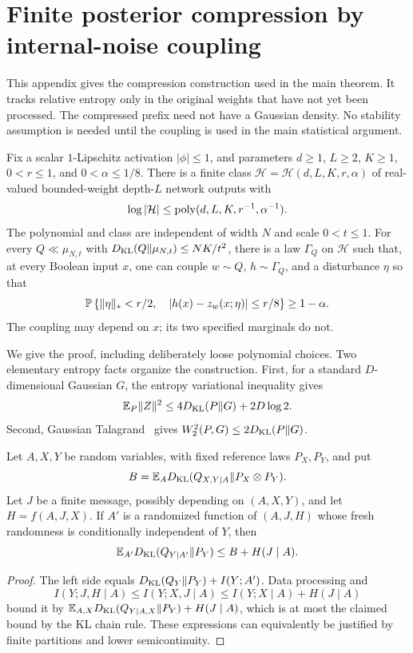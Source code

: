 \section{Finite posterior compression by internal-noise coupling}
\label{sec:robust-entropy}

This appendix gives the compression construction used in the main theorem.
It tracks relative entropy only in the original weights that have not yet
been processed. The compressed prefix need not have a Gaussian density.
No stability assumption is needed until the coupling is used in the main
statistical argument.

\begin{theorem}
\label{thm:robust-entropy}
Fix a scalar $1$-Lipschitz activation $|\phi|\le1$, and parameters
$d\ge1$, $L\ge2$, $K\ge1$, $0<r\le1$, and $0<\alpha\le1/8$.
There is a finite class $\mathcal H=\mathcal H(d,L,K,r,\alpha)$ of
real-valued bounded-weight depth-$L$ network outputs with
\[
 \log|\mathcal H|\le\operatorname{poly}(d,L,K,r^{-1},\alpha^{-1}).
\]
The polynomial and class are independent of width $N$ and scale $0<t\le1$.
For every $Q\ll\mu_{N,t}$ with
$D_{\rm KL}(Q\Vert\mu_{N,t})\le NK/t^2$, there is a law $\Gamma_Q$ on
$\mathcal H$ such that, at every Boolean input $x$, one can couple
$w\sim Q$, $h\sim\Gamma_Q$, and a disturbance $\eta$ so that
\[
 \mathbb P\left\{\|\eta\|_*<r/2,\quad
       |h(x)-z_w(x;\eta)|\le r/8\right\}\ge1-\alpha.
\]
The coupling may depend on $x$; its two specified marginals do not.
\end{theorem}

We give the proof, including deliberately loose polynomial choices.
Two elementary entropy facts organize the construction. First, for a standard
$D$-dimensional Gaussian $G$, the entropy variational inequality gives
\begin{equation}\label{eq:entropy-moment}
 \mathbb E_P\|Z\|^2\le4D_{\rm KL}(P\Vert G)+2D\log2.
\end{equation}
Second, Gaussian Talagrand~\cite{talagrand} gives
$W_2^2(P,G)\le2D_{\rm KL}(P\Vert G)$.

\begin{lemma}
\label{lem:future-entropy}
Let $A,X,Y$ be random variables, with fixed reference laws $P_X,P_Y$, and put
\[
 B=\mathbb E_A D_{\rm KL}(Q_{X,Y\mid A}\Vert P_X\otimes P_Y).
\]
Let $J$ be a finite message, possibly depending on $(A,X,Y)$, and let
$H=f(A,J,X)$. If $A'$ is a randomized function of $(A,J,H)$ whose fresh
randomness is conditionally independent of $Y$, then
\[
 \mathbb E_{A'}D_{\rm KL}(Q_{Y\mid A'}\Vert P_Y)\le B+H(J\mid A).
\]
\end{lemma}
\begin{proof}
The left side equals $D_{\rm KL}(Q_Y\Vert P_Y)+I(Y;A')$.
Data processing and
\[
 I(Y;J,H\mid A)\le I(Y;X,J\mid A)
 \le I(Y;X\mid A)+H(J\mid A)
\]
bound it by $\mathbb E_{A,X}D_{\rm KL}(Q_{Y\mid A,X}\Vert P_Y)+H(J\mid A)$,
which is at most the claimed bound by the KL chain rule. These expressions
can equivalently be justified by finite partitions and lower semicontinuity.
\end{proof}

